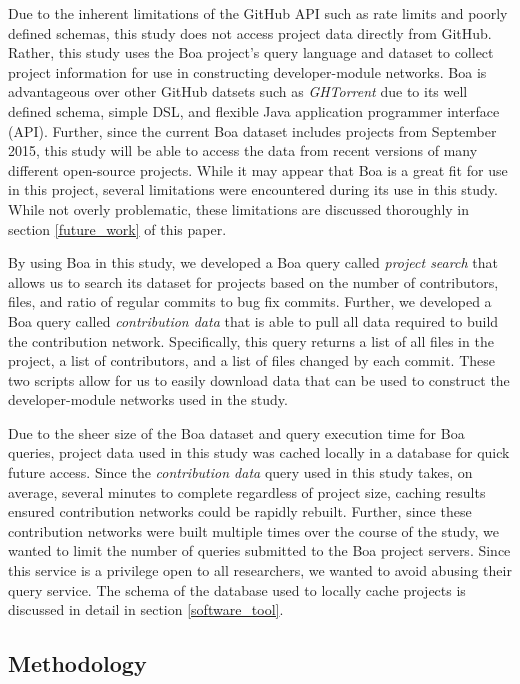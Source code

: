 \documentclass{sig-alternate-05-2015}
\begin{document}
Due to the inherent limitations of the GitHub API such as rate limits and poorly defined schemas, this study does not access project data directly from GitHub. Rather, this study uses the Boa project's query language and dataset to collect project information for use in constructing developer-module networks. Boa is advantageous over other GitHub datsets such as \textit{GHTorrent} due to its well defined schema, simple DSL, and flexible Java application programmer interface (API). Further, since the current Boa dataset includes projects from September 2015, this study will be able to access the data from recent versions of many different open-source projects. While it may appear that Boa is a great fit for use in this project, several limitations were encountered during its use in this study. While not overly problematic, these limitations are discussed thoroughly in section \ref{future_work} of this paper.

By using Boa in this study, we developed a Boa query called \textit{project search} that allows us to search its dataset for projects based on the number of contributors, files, and ratio of regular commits to bug fix commits. Further, we developed a Boa query called \textit{contribution data} that is able to pull all data required to build the contribution network. Specifically, this query returns a list of all files in the project, a list of contributors, and a list of files changed by each commit. These two scripts allow for us to easily download data that can be used to construct the developer-module networks used in the study. 

Due to the sheer size of the Boa dataset and query execution time for Boa queries, project data used in this study was cached locally in a database for quick future access. Since the \textit{contribution data} query used in this study takes, on average, several minutes to complete regardless of project size, caching results ensured contribution networks could be rapidly rebuilt. Further, since these contribution networks were built multiple times over the course of the study, we wanted to limit the number of queries submitted to the Boa project servers. Since this service is a privilege open to all researchers, we wanted to avoid abusing their query service. The schema of the database used to locally cache projects is discussed in detail in section \ref{software_tool}.

\subsection{Methodology}
\label{methodology}
\end{document}
